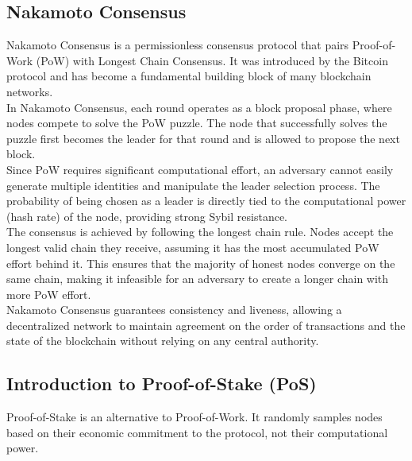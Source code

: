 \subsection{Nakamoto Consensus}
Nakamoto Consensus is a permissionless consensus protocol that pairs Proof-of-Work (PoW) with Longest Chain Consensus. It was introduced by the Bitcoin protocol and has become a fundamental building block of many blockchain networks.\\
In Nakamoto Consensus, each round operates as a block proposal phase, where nodes compete to solve the PoW puzzle. The node that successfully solves the puzzle first becomes the leader for that round and is allowed to propose the next block.\\
Since PoW requires significant computational effort, an adversary cannot easily generate multiple identities and manipulate the leader selection process. The probability of being chosen as a leader is directly tied to the computational power (hash rate) of the node, providing strong Sybil resistance.\\
The consensus is achieved by following the longest chain rule. Nodes accept the longest valid chain they receive, assuming it has the most accumulated PoW effort behind it. This ensures that the majority of honest nodes converge on the same chain, making it infeasible for an adversary to create a longer chain with more PoW effort.\\
Nakamoto Consensus guarantees consistency and liveness, allowing a decentralized network to maintain agreement on the order of transactions and the state of the blockchain without relying on any central authority.



\subsection{Introduction to Proof-of-Stake (PoS)}
Proof-of-Stake is an alternative to Proof-of-Work. It randomly samples nodes based on their economic commitment to the protocol, not their computational power.

